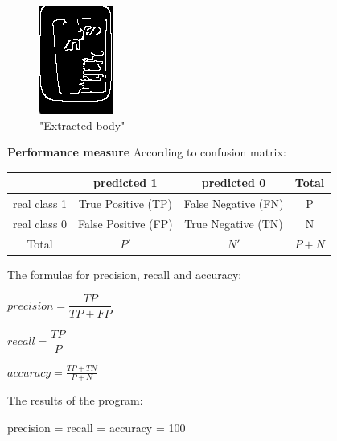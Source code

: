 \documentclass[12pt]{article}
\begin{document}
	\begin{figure}[H]
		\centering
		\includegraphics{6}
		\caption{"Extracted body"}
	\end{figure}
	
	\medskip
	
	\textbf{Performance measure}
	According to confusion matrix:
	
	\begin{tabular}{|c||c|c|c|}
		\hline
		\ & predicted 1 & predicted 0 & Total \\
		\hline
		real class 1 & True Positive (TP) & False Negative (FN) & P\\
		\hline
		real class 0 & False Positive (FP) & True Negative (TN) & N \\
		\hline
		Total & $P'$ & $N'$ & $P+N$\\
		\hline 
	\end{tabular}
	\medskip
	
	The formulas for precision, recall and accuracy:
	\begin{list}{)~}{}
		\item $precision = \dfrac{TP}{TP+FP}$
		\item $recall = \dfrac{TP}{P}$
		\item $accuracy = \frac{TP+TN}{P+N}$
	\end{list}
	
	The results of the program:

	precision = recall = accuracy = 100%
	
\end{document}
